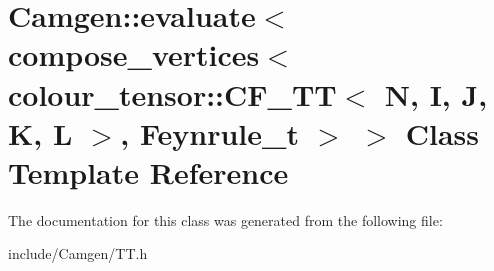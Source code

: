 \hypertarget{a00163}{}\section{Camgen\+:\+:evaluate$<$ compose\+\_\+vertices$<$ colour\+\_\+tensor\+:\+:C\+F\+\_\+\+T\+T$<$ N, I, J, K, L $>$, Feynrule\+\_\+t $>$ $>$ Class Template Reference}
\label{a00163}


The documentation for this class was generated from the following file\+:\begin{DoxyCompactItemize}
\item 
include/\+Camgen/T\+T.\+h\end{DoxyCompactItemize}
